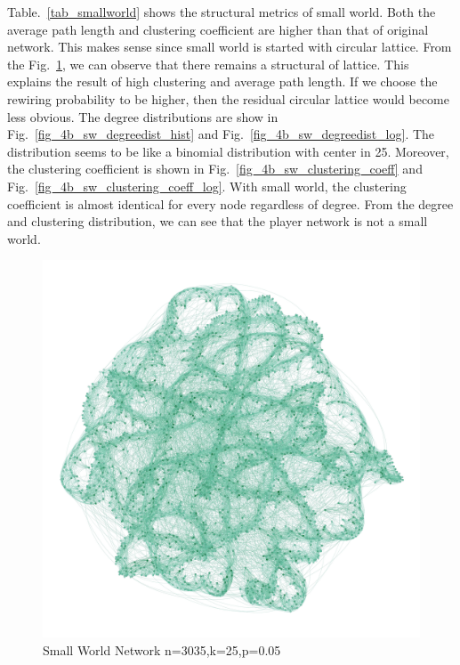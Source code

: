 \documentclass[runningheads]{llncs}
\begin{document}
Table.~\ref{tab_smallworld} shows the structural metrics of small world. Both the average path length and clustering coefficient are higher than that of original network. This makes sense since small world is started with circular lattice. From the Fig.~\ref{fig_4_smallworld}, we can observe that there remains a structural of lattice. This explains the result of high clustering and average path length. If we choose the rewiring probability to be higher, then the residual circular lattice would become less obvious. The degree distributions are show in Fig.~\ref{fig_4b_sw_degreedist_hist} and  Fig.~\ref{fig_4b_sw_degreedist_log}. The distribution seems to be like a binomial distribution with center in 25. Moreover, the clustering coefficient is shown in Fig.~\ref{fig_4b_sw_clustering_coeff} and  Fig.~\ref{fig_4b_sw_clustering_coeff_log}. With small world, the clustering coefficient is almost identical for every node regardless of degree. From the degree and clustering distribution, we can see that the player network is not a small world. 

\begin{figure}
\includegraphics[width=\textwidth]{4b_small_world}
\caption{Small World Network n=3035,k=25,p=0.05} \label{fig_4_smallworld}
\end{figure}
\end{document}
